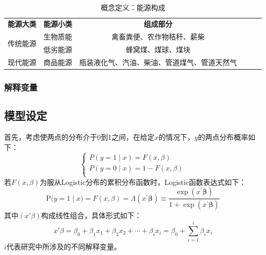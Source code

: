 \documentclass[a4paper, 12pt, oneside]{article} %
\begin{document}
	~\
	\begin{table}[htbp]
		\centering
		{\heiti {} \caption{概念定义：能源构成}}
		\label{表1}
		\begin{tabular}{llllll}
			\cline{1-3}
			\multicolumn{1}{c}{\textbf{能源大类}}         & \multicolumn{1}{c}{\textbf{能源小类}} & \multicolumn{1}{c}{\textbf{组成部分}}          &  &  &  \\ \cline{1-3}
			\multicolumn{1}{c}{\multirow{2}{*}{传统能源}} & \multicolumn{1}{c}{生物质能}          & \multicolumn{1}{c}{禽畜粪便、农作物秸秆、薪柴}          &  &  &  \\
			\multicolumn{1}{c}{}                      & \multicolumn{1}{c}{低劣能源}          & \multicolumn{1}{c}{蜂窝煤、煤球、煤块}              &  &  &  \\
			\multicolumn{1}{c}{现代能源}                  & \multicolumn{1}{c}{商品能源}          & \multicolumn{1}{c}{瓶装液化气、汽油、柴油、管道煤气、管道天然气} &  &  &  \\ \cline{1-3}
		\end{tabular}
	\end{table}
	\subsubsection{解释变量}
	\subsection{模型设定}
	首先，考虑使两点的分布介于0到1之间，在给定$x$的情况下，$y$的两点分布概率如下：
	\begin{equation}
		\left\{ \begin{array}{l}
			P(y=1\mid x)=F(x,\beta )\\
			P(y=0\mid x)=1-F(x,\beta )\\
		\end{array} \right. 
	\end{equation}
	若$F(x,\beta )$为服从Logistic分布的累积分布函数时，Logistic函数表达式如下：
	\begin{equation}
		\mathrm{P(}y=1\mid x)=F(x,\beta )=\Lambda \left( x^{'}\boldsymbol{\beta } \right) \equiv \frac{\exp \left( x^{'}\boldsymbol{\beta } \right)}{1+\exp \left( x^{'}\boldsymbol{\beta } \right)}
	\end{equation}
	其中$\left( x'\beta \right)$构成线性组合，具体形式如下：
	\begin{equation}
		x'\beta =\beta _0+\beta _1x_1+\beta _2x_2+\cdots +\beta _ix_i=\beta _0+\sum_{i=1}^i{\beta _i}x_i
	\end{equation}
	$i$代表研究中所涉及的不同解释变量。
	
\end{document}
